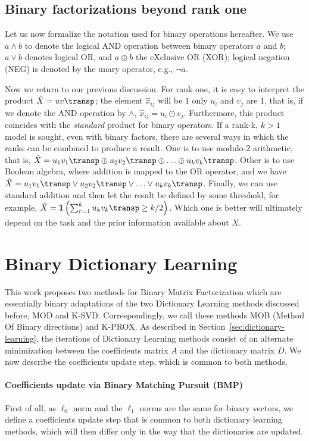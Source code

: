 \documentclass[a4paper]{IEEEtran}
\begin{document}
\subsection{Binary factorizations beyond rank one}

\def\xor{\oplus}

Let us now formalize the notation used for binary operations hereafter. We use $a \land b$ to denote the logical AND operation between binary operators $a$ and $b$; $a \lor b$ denotes logical OR, and $a \xor b$ the eXclusive OR (XOR); logical negation (NEG) is denoted by the unary operator, e.g., $\neg a$.
 
Now we return to our previous discussion. For rank one, it is easy to interpret the product $\hat{X}=uv\transp$; the element $\hat{x}_{ij}$ will be $1$ only $u_i$ and $v_j$ are $1$, that is, if we denote the AND operation by $\land$,  $\hat{x}_{ij} = u_i \odot v_j$. Furthermore, this product coincides with the \emph{standard} product for binary operators. If a rank-k, $k>1$ model is sought, even with binary factors, there are several ways in which the ranks can be combined to produce a result. One is to use modulo-2 arithmetic, that is, $\hat{X} = u_1v_1\transp \oplus u_2v_2\transp \oplus \ldots \oplus u_kv_k\transp$. Other is to use Boolean algebra, where addition is mapped to the OR operator, and we have $\hat{X} = u_1v_1\transp \lor u_2v_2\transp \lor \ldots \lor u_kv_k\transp$. Finally, we can use standard addition and then let the result be defined by some threshold, for example,
$\hat{X} = \indicator\left(\sum_{r=1}^k u_kv_k\transp \geq k/2 \right)$.
Which one is better will ultimately depend on the task and the prior information available about $X$.

\section{Binary Dictionary Learning}

This work proposes two methods for Binary Matrix Factorization which are essentially binary adaptations of the two Dictionary Learning methods discussed before, MOD and K-SVD. Correspondingly, we call these methods MOB (Method Of Binary directions) and K-PROX. As described in Section~\ref{sec:dictionary-learning}, the iterations of Dictionary Learning methods consist of an alternate minimization between the coefficients matrix $A$ and the dictionary matrix $D$. We now describe the coefficients update step, which is common to both methods.

\paragraph{Coefficients update via Binary Matching Pursuit (BMP)}
First of all, as $\ell_0$ norm and the $\ell_1$ norms are the same for binary vectors, we define a coefficients update step that is common to both dictionary learning methods, which will then differ only in the way that the dictionaries are updated.
\end{document}
